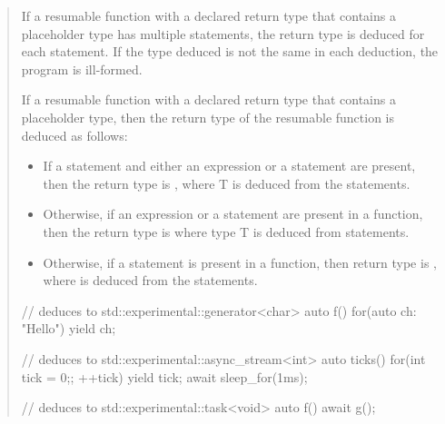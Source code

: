 \begin{quote}
\setcounter{Paras}{15}
\pnum
If a resumable function with a declared return type that contains a placeholder type has multiple  statements, the return type is deduced for each
 statement. If the type deduced is not the same in each
deduction, the program is ill-formed.

\pnum
If a resumable function with a declared return type that contains a placeholder type, then the return type of the resumable function is deduced as follows:

\begin{itemize}
\item If a  statement and either an  expression or a  statement are present, then
the return type is , where T is deduced from the  statements.

\item Otherwise, if an  expression or a  statement are present in a function, then
the return type is  where type T is deduced from 
 statements.

\item Otherwise, if a  statement is present in a function, then return type is
,
where  is deduced from the  statements.

\end{itemize}
\enterexample
\begin{codeblock}
// deduces to std::experimental::generator<char>
auto f() { for(auto ch: "Hello") yield ch; }

// deduces to std::experimental::async_stream<int>
auto ticks() {
  for(int tick = 0;; ++tick) {
    yield tick;
    await sleep_for(1ms);
  }
}

// deduces to std::experimental::task<void>
auto f() {  await g(); }

\end{codeblock}
\exitexample
\end{quote}
